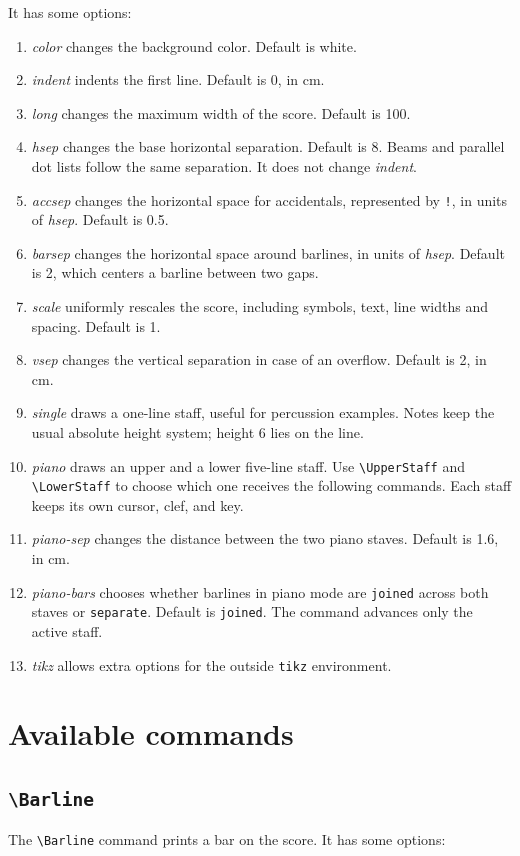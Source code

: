 \documentclass[final]{article}
\begin{document}
It has some options:
	\begin{enumerate}[-]
		\item \textsl{color} changes the background color. Default is white.
		\item \textsl{indent} indents the first line. Default is 0, in cm.
		\item \textsl{long} changes the maximum width of the score. Default is 100.
		\item \textsl{hsep} changes the base horizontal separation. Default is 8. Beams and parallel dot lists follow the same separation. It does not change \textsl{indent}.
		\item \textsl{accsep} changes the horizontal space for accidentals, represented by \texttt{!}, in units of \textsl{hsep}. Default is 0.5.
		\item \textsl{barsep} changes the horizontal space around barlines, in units of \textsl{hsep}. Default is 2, which centers a barline between two gaps. 
		\item \textsl{scale} uniformly rescales the score, including symbols, text, line widths and spacing. Default is 1.
		\item \textsl{vsep} changes the vertical separation in case of an overflow. Default is 2, in cm.
		\item \textsl{single} draws a one-line staff, useful for percussion examples. Notes keep the usual absolute height system; height 6 lies on the line.
		\item \textsl{piano} draws an upper and a lower five-line staff. Use \verb|\UpperStaff| and \verb|\LowerStaff| to choose which one receives the following commands. Each staff keeps its own cursor, clef, and key.
		\item \textsl{piano-sep} changes the distance between the two piano staves. Default is 1.6, in cm.
		\item \textsl{piano-bars} chooses whether barlines in piano mode are \texttt{joined} across both staves or \texttt{separate}. Default is \texttt{joined}. The command advances only the active staff.
		\item \textsl{tikz} allows extra options for the outside \texttt{tikz} environment.
	\end{enumerate}

	\section{Available commands}
	
	\subsection{\texttt{\textbackslash Barline}}
	The \verb|\Barline| command prints a bar on the score. It has some options:
	
\end{document}

